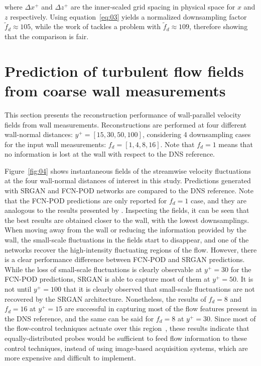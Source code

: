 \noindent where $\Delta x^{+}$ and $\Delta z^{+}$ are the inner-scaled grid spacing in physical space for $x$ and $z$ respectively.
Using equation~\ref{eq:03} yields a normalized downsampling factor $\tilde{f}_{d}\approx 105$, while the work of \citet{kim2021unsupervised} tackles a problem with $\tilde{f}_{d}\approx 109$, therefore showing that the comparison is fair.


\section{Prediction of turbulent flow fields from coarse wall measurements}\label{sec:flow}

This section presents the reconstruction performance of wall-parallel velocity fields from wall measurements.
Reconstructions are performed at four different wall-normal distances: $y^+=[15,30,50,100]$, considering 4 downsampling cases for the input wall measurements: $f_d=[1,4,8,16]$.
Note that $f_d=1$ means that no information is lost at the wall with respect to the DNS reference.

Figure~\ref{fig:04} shows instantaneous fields of the streamwise velocity fluctuations at the four wall-normal distances of interest in this study.
Predictions generated with SRGAN and FCN-POD networks are compared to the DNS reference.
Note that the FCN-POD predictions are only reported for $f_d=1$ case, and they are analogous to the results presented by \citet{guastoni2020convolutional}.
Inspecting the fields, it can be seen that the best results are obtained closer to the wall, with the lowest downsamplings.
When moving away from the wall or reducing the information provided by the wall, the small-scale fluctuations in the fields start to disappear, and one of the networks recover the high-intensity fluctuating regions of the flow.
However, there is a clear performance difference between FCN-POD and SRGAN predictions.
While the loss of small-scale fluctuations is clearly observable at $y^+=30$ for the FCN-POD predictions, SRGAN is able to capture most of them at $y^+=50$.
It is not until $y^+=100$ that it is clearly observed that small-scale fluctuations are not recovered by the SRGAN architecture.
Nonetheless, the results of $f_d=8$ and $f_d=16$ at $y^+=15$ are successful in capturing most of the flow features present in the DNS reference, and the same can be said for $f_d=8$ at $y^+=30$.
Since most of the flow-control techniques actuate over this region~\citep{choi1994active,lee1997application,bai2014active}, these results indicate that equally-distributed probes would be sufficient to feed flow information to these control techniques, instead of using image-based acquisition systems, which are more expensive and difficult to implement.

